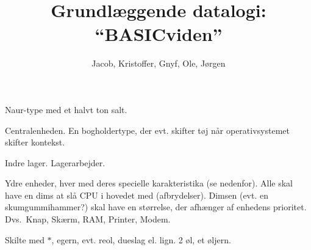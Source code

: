 \documentclass{article}
\title{Grundlæggende datalogi: ``BASICviden''}
\author{Jacob, Kristoffer, Gnyf, Ole, Jørgen}
\begin{document}
\maketitle

\begin{roles}



Naur-type med et halvt ton salt.


 Centralenheden. En bogholdertype, der evt. skifter tøj
når operativsystemet skifter kontekst.

   Indre lager. Lagerarbejder.

 Ydre enheder, hver
med deres spe\-ci\-el\-le  ka\-rak\-te\-ri\-sti\-ka (se
nedenfor). Alle skal have en dims at slå CPU i ho\-ve\-det med
(afbrydelser). Dimsen (evt.  en skum\-gum\-mi\-ham\-mer?)  skal have en
størrelse, der afhænger af enhedens pri\-o\-ri\-tet. Dvs.\
Knap, Skærm, RAM, Printer, Modem.

  Skilte med {\Large$*$}, egern, evt. reol, dueslag el. lign.
  2 øl, et øljern.

\end{roles}
\end{document}
